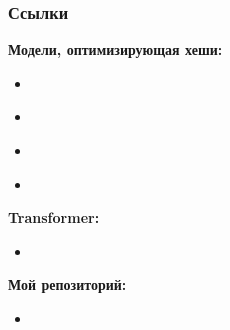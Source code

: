 \documentclass{beamer}
\begin{document}
\begin{frame}
	\frametitle{Ссылки}
	\textbf{Модели, оптимизирующая хеши:}
	\begin{itemize}
		\item
		\href{https://www.kdd.org/kdd2016/papers/files/rpp0086-caoA.pdf}{\color{blue}{Deep Visual-Semantic Hashing for Cross-Modal Retrieval}}
		
		\item
		\href{https://aaai.org/ocs/index.php/AAAI/AAAI18/paper/view/16449/15697}{\color{blue}{Dual Deep Neural Networks Cross-Modal Hashing}}
		
		\item
		\href{https://arxiv.org/abs/1805.01963}{\color{blue}{MTFH: A Matrix Tri-Factorization Hashing Framework for Efficient Cross-Modal Retrieval}}
		
		\item
		\href{https://arxiv.org/abs/1804.01223}{\color{blue}{Self-Supervised Adversarial Hashing Networks for Cross-Modal Retrieval}}
	\end{itemize}

	\textbf{Transformer:}
	\begin{itemize}
		\item
		\href{https://arxiv.org/abs/1706.03762}{\color{blue}{Attention Is All You Need}}
	\end{itemize}

	\textbf{Мой репозиторий:}
	\begin{itemize}
		\item
		\href{https://github.com/GrigoryBartosh/hse06_research_work}{\color{blue}{github.com}}
	\end{itemize}
\end{frame}
\end{document}

